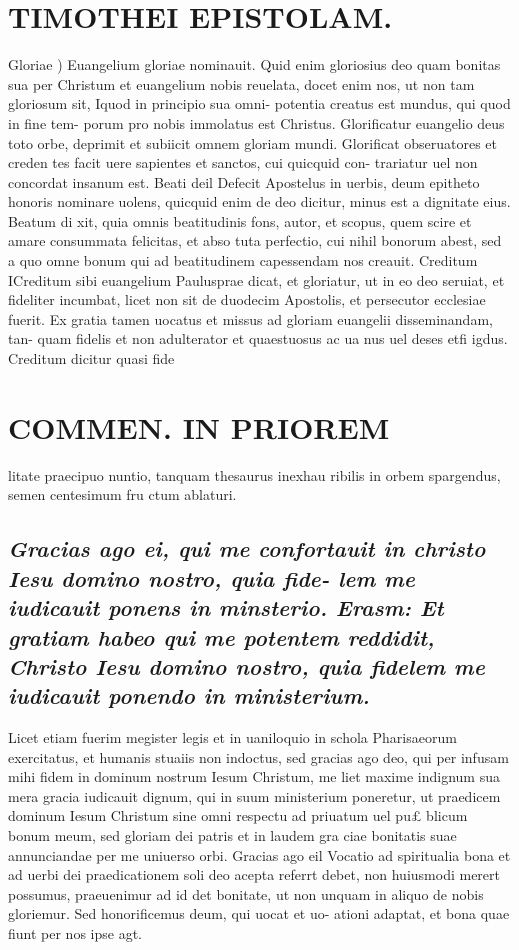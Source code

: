 \documentclass{article}
\begin{document}
\begin{pages}
\section*{TIMOTHEI EPISTOLAM. }
\marginpar{[ p.23 ]}\pstart Gloriae ) Euangelium gloriae nominauit. Quid enim gloriosius deo quam bonitas sua per Christum et euangelium nobis reuelata, docet enim nos, ut non tam gloriosum sit, Iquod in principio sua omni- potentia creatus est mundus, qui quod in fine tem- porum pro nobis immolatus est Christus. Glorificatur euangelio deus toto orbe, deprimit et subiicit omnem gloriam mundi. Glorificat obseruatores et creden tes facit uere sapientes et sanctos, cui quicquid con- trariatur uel non concordat insanum est.  \pend\pstart Beati deil Defecit Apostelus in uerbis, deum epitheto honoris nominare uolens, quicquid enim de deo dicitur, minus est a dignitate eius. Beatum di xit, quia omnis beatitudinis fons, autor, et scopus, quem scire et amare consummata felicitas, et abso tuta perfectio, cui nihil bonorum abest, sed a quo omne bonum qui ad beatitudinem capessendam nos creauit.  \pend\pstart Creditum ICreditum sibi euangelium Paulusprae dicat, et gloriatur, ut in eo deo seruiat, et fideliter incumbat, licet non sit de duodecim Apostolis, et persecutor ecclesiae fuerit. Ex gratia tamen uocatus et missus ad gloriam euangelii disseminandam, tan- quam fidelis et non adulterator et quaestuosus ac ua nus uel deses etfi igdus. Creditum dicitur quasi fide  \pend
\section*{COMMEN. IN PRIOREM }
\marginpar{[ p.24 ]}\pstart litate praecipuo nuntio, tanquam thesaurus inexhau ribilis in orbem spargendus, semen centesimum fru ctum ablaturi.  \pend
{}
{}
\subsection*{\textit{Gracias ago ei, qui me confortauit in christo Iesu domino nostro, quia fide- lem me iudicauit ponens in minsterio. Erasm: Et gratiam habeo qui me potentem reddidit, Christo Iesu domino nostro, quia fidelem me iudicauit ponendo in ministerium. }}\pstart Licet etiam fuerim megister legis et in uaniloquio in schola Pharisaeorum exercitatus, et humanis stuaiis non indoctus, sed gracias ago deo, qui per infusam mihi fidem in dominum nostrum Iesum Christum, me liet maxime indignum sua mera gracia iudicauit dignum, qui in suum ministerium poneretur, ut praedicem dominum Iesum Christum sine omni respectu ad priuatum uel pu£ blicum bonum meum, sed gloriam dei patris et in laudem gra ciae bonitatis suae annunciandae per me uniuerso orbi.  \pend\pstart Gracias ago eil Vocatio ad spiritualia bona et ad uerbi dei praedicationem soli deo acepta referrt debet, non huiusmodi merert possumus, praeuenimur ad id det bonitate, ut non unquam in aliquo de nobis gloriemur. Sed honorificemus deum, qui uocat et uo- ationi adaptat, et bona quae fiunt per nos ipse agt.  \pend

\end{pages}
\end{document}
